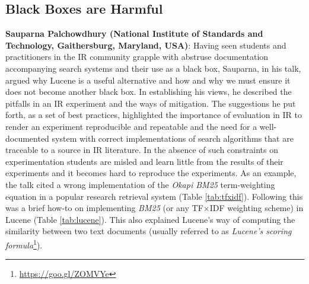 \subsection*{Black Boxes are Harmful}

{\bf Sauparna Palchowdhury (National Institute of Standards and
  Technology, Gaithersburg, Maryland, USA)}: Having seen students and
practitioners in the IR community grapple with abstruse documentation
accompanying search systems and their use as a black box, Sauparna, in
his talk, argued why Lucene is a useful alternative and how and why we
must ensure it does not become another black box. In establishing his
views, he described the pitfalls in an IR experiment and the ways of
mitigation. The suggestions he put forth, as a set of best practices,
highlighted the importance of evaluation in IR to render an experiment
reproducible and repeatable and the need for a well-documented system
with correct implementations of search algorithms that are traceable
to a source in IR literature. In the absence of such constraints on
experimentation students are misled and learn little from the results
of their experiments and it becomes hard to reproduce the
experiments. As an example, the talk cited a wrong implementation of
the \emph{Okapi BM25} term-weighting equation in a popular research
retrieval system (Table \ref{tab:tfxidf}). Following this was a brief
how-to on implementing \emph{BM25} (or any TF$\times$IDF weighting
scheme) in Lucene (Table \ref{tab:lucene}). This also explained
Lucene's way of computing the similarity between two text documents
(usually referred to as \emph{Lucene's scoring
  formula}\footnote{\url{https://goo.gl/ZOMVYe}}).

